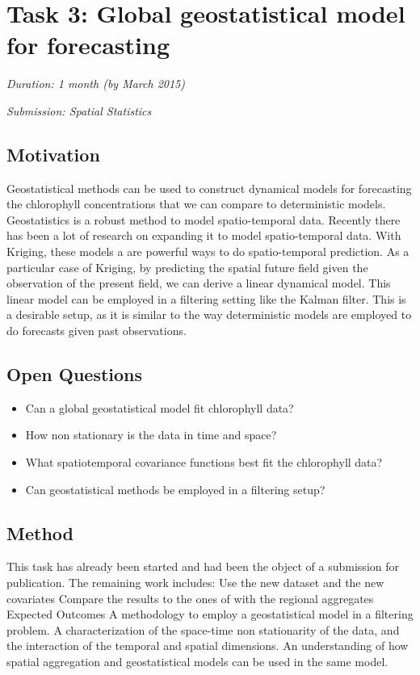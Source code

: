 \section{Task 3: Global geostatistical model for forecasting}

\noindent
\emph{Duration: 1 month (by March 2015)}

\noindent
\emph{Submission: Spatial Statistics}

\subsection{Motivation}

Geostatistical methods can be used to construct dynamical models for forecasting the chlorophyll concentrations that we can compare to deterministic models. Geostatistics is a robust method to model spatio-temporal data. Recently there has been a lot of research on expanding it to model spatio-temporal data. With Kriging, these models a are powerful ways to do spatio-temporal prediction. As a particular case of Kriging, by predicting the spatial future field given the observation of the present field, we can derive a linear dynamical model. This linear model can be employed in a filtering setting like the Kalman filter. This is a desirable setup, as it is similar to the way deterministic models are employed to do forecasts given past observations. 

\subsection{Open Questions}

\begin{itemize}
\item Can a global geostatistical model fit chlorophyll data?
\item How non stationary is the data in time and space?
\item What spatiotemporal covariance functions best fit the chlorophyll data?
\item Can geostatistical methods be employed in a filtering setup?
\end{itemize}

\subsection{Method}

This task has already been started and had been the object of a submission for publication. The remaining work includes:
Use the new dataset and the new covariates
Compare the results to the ones of with the regional aggregates
Expected Outcomes
A methodology to employ a geostatistical model in a filtering problem.
A characterization of the space-time non stationarity of the data, and the interaction of the temporal and spatial dimensions.
An understanding of how spatial aggregation and geostatistical models can be used in the same model. 

